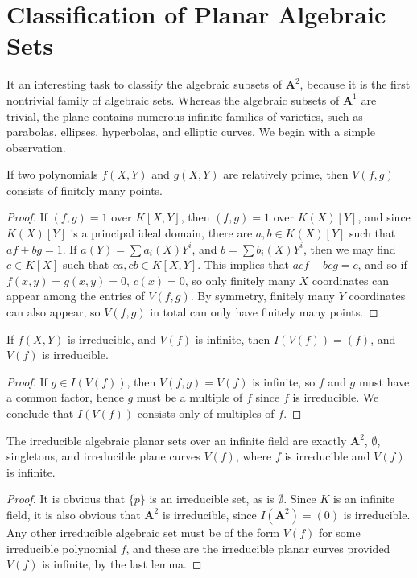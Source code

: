 \section{Classification of Planar Algebraic Sets}

It an interesting task to classify the algebraic subsets of $\mathbf{A}^2$, because it is the first nontrivial family of algebraic sets. Whereas the algebraic subsets of $\mathbf{A}^1$ are trivial, the plane contains numerous infinite families of varieties, such as parabolas, ellipses, hyperbolas, and elliptic curves. We begin with a simple observation.

\begin{theorem}
    If two polynomials $f(X,Y)$ and $g(X,Y)$ are relatively prime, then $V(f,g)$ consists of finitely many points.
\end{theorem}
\begin{proof}
    If $(f,g) = 1$ over $K[X,Y]$, then $(f,g) = 1$ over $K(X)[Y]$, and since $K(X)[Y]$ is a principal ideal domain, there are $a,b \in K(X)[Y]$ such that $af + bg = 1$. If $a(Y) = \sum a_i(X)Y^i$, and $b = \sum b_i(X) Y^i$, then we may find $c \in K[X]$ such that $ca, cb \in K[X,Y]$. This implies that $acf + bcg = c$, and so if $f(x,y) = g(x,y) = 0$, $c(x) = 0$, so only finitely many $X$ coordinates can appear among the entries of $V(f,g)$. By symmetry, finitely many $Y$ coordinates can also appear, so $V(f,g)$ in total can only have finitely many points.
\end{proof}

\begin{corollary}
    If $f(X,Y)$ is irreducible, and $V(f)$ is infinite, then $I(V(f)) = (f)$, and $V(f)$ is irreducible.
\end{corollary}
\begin{proof}
    If $g \in I(V(f))$, then $V(f,g) = V(f)$ is infinite, so $f$ and $g$ must have a common factor, hence $g$ must be a multiple of $f$ since $f$ is irreducible. We conclude that $I(V(f))$ consists only of multiples of $f$.
\end{proof}

\begin{corollary}
    The irreducible algebraic planar sets over an infinite field are exactly $\mathbf{A}^2$, $\emptyset$, singletons, and irreducible plane curves $V(f)$, where $f$ is irreducible and $V(f)$ is infinite.
\end{corollary}
\begin{proof}
    It is obvious that $\{ p \}$ is an irreducible set, as is $\emptyset$. Since $K$ is an infinite field, it is also obvious that $\mathbf{A}^2$ is irreducible, since $I(\mathbf{A}^2) = (0)$ is irreducible. Any other irreducible algebraic set must be of the form $V(f)$ for some irreducible polynomial $f$, and these are the irreducible planar curves provided $V(f)$ is infinite, by the last lemma.
\end{proof}

